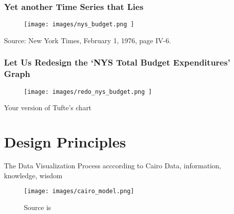 \documentclass[notes, aspectratio=1610]{beamer}
\begin{document}
\begin{frame}
	\frametitle{Yet another Time Series that Lies}
	\begin{figure}
		\begin{small}
			\begin{center}
				\texttt{[image: 
					images/nys\_budget.png
					]}
			\end{center}
		\end{small}
	\end{figure}

	\footnotesize
	Source: New York Times, February 1, 1976, page IV-6.
\end{frame}

\begin{frame}
	\frametitle{Let Us Redesign the `NYS Total Budget Expenditures' Graph}
	\begin{figure}
		\begin{small}
			\begin{center}
				\texttt{[image: 
					images/redo\_nys\_budget.png
					]}
			\end{center}
		\end{small}
	\end{figure}
\end{frame}

\begin{frame}{}
	\LARGE \centering Your version of Tufte's chart 
\end{frame}

\section{Design Principles}

\begin{frame}{The Data Visualization Process acccording to Cairo}
	{Data, information, knowledge, wisdom}{}
	\begin{figure}
		\texttt{[image: images/cairo\_model.png]}
		\caption*{Source is \cite[][page 29]{cairo2012}}
	\end{figure}
\end{frame}
\end{document}
